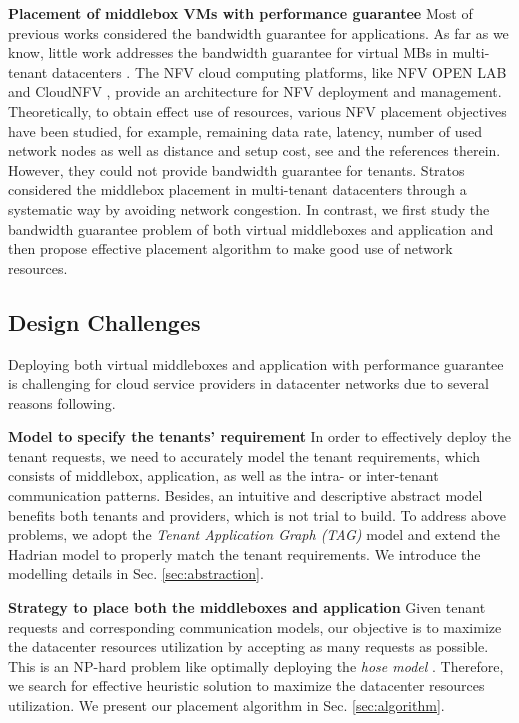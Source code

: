\documentclass[review]{elsarticle}
\begin{document}
\textbf{Placement of middlebox VMs with performance guarantee}
Most of previous works considered the bandwidth guarantee for applications. As far as we know, little work addresses the bandwidth guarantee for virtual MBs in multi-tenant datacenters \cite{nfv_challenges}. The NFV cloud computing platforms, like NFV OPEN LAB \cite{HuaweiNFV} and CloudNFV \cite{CloudNFV}, provide an architecture for NFV deployment and management.
 Theoretically, to obtain effect use of resources, various NFV placement objectives have been studied, for example, remaining data rate, latency, number of used network nodes as well as distance and setup cost, see \cite{M14sap, cohen2015near} and the references therein. However, they could not provide bandwidth guarantee for tenants. Stratos \cite{stratos12} considered the middlebox placement in multi-tenant datacenters through a systematic way by avoiding network congestion. In contrast, we first study the bandwidth guarantee
 problem of both virtual middleboxes and application and then propose effective placement algorithm to make good use of network resources.
 

\subsection{Design Challenges}

Deploying both virtual middleboxes and application with performance guarantee is challenging for cloud service providers in datacenter networks due to several reasons following. 

\textbf{Model to specify the tenants' requirement}
In order to effectively deploy the tenant requests, we need to accurately model the tenant requirements, which consists of middlebox, application, as well as the intra- or inter-tenant communication patterns. Besides, an intuitive and descriptive abstract model benefits both tenants and providers, which is not trial to build. To address above problems, we adopt the \emph{Tenant Application Graph (TAG)} \cite{cloudmirror} model and extend the Hadrian \cite{B13cta} model to properly match the tenant requirements. We introduce the modelling details in Sec. \ref{sec:abstraction}. 


\textbf{Strategy to place both the middleboxes and application}
Given tenant requests and corresponding communication models, our objective is to maximize the datacenter resources utilization by accepting as many requests as possible. This is an NP-hard problem like optimally deploying the \emph{hose model} \cite{hose_model, cloudmirror}. Therefore, we search for effective heuristic solution to maximize the datacenter resources utilization. We present our placement algorithm in Sec. \ref{sec:algorithm}. 
\end{document}
